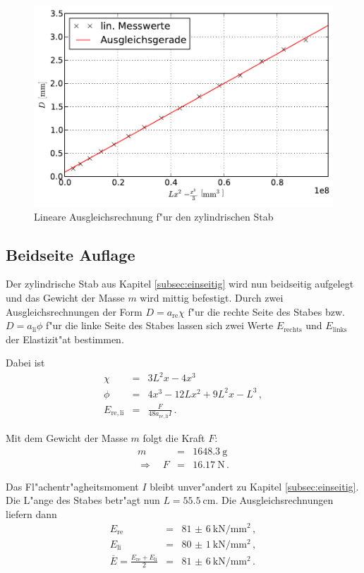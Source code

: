 		\begin{figure}[h]
			\centering
			\includegraphics[width = 13cm]{img/plot2.pdf}
			\caption{Lineare Ausgleichsrechnung f"ur den zylindrischen Stab \label{fig:plot2}}
		\end{figure}

		\clearpage

	\subsection{Beidseite Auflage}
	\label{subsec:beidseitig}
		Der zylindrische Stab aus Kapitel \ref{subsec:einseitig} wird nun beidseitig aufgelegt und das Gewicht der Masse $m$ wird mittig befestigt.
		Durch zwei Ausgleichsrechnungen der Form $D = a_\mathrm{re}\chi$ f"ur die rechte Seite des Stabes bzw. $D = a_\mathrm{li}\phi$ f"ur die linke Seite des Stabes lassen sich zwei Werte $E_\mathrm{rechts}$ und $E_\mathrm{links}$ der Elastizit"at bestimmen.

		Dabei ist
		\begin{eqnarray*}
			\chi & = & 3L^2x - 4x^3 \, \\
			\phi & = & 4x^3 - 12 Lx^2 + 9L^2x - L^3 \,, \\
			E_\mathrm{re,li} & = & \frac{F}{48 a_\mathrm{re,li} I} \,.
		\end{eqnarray*}

		Mit dem Gewicht der Masse $m$ folgt die Kraft $F$:
		\begin{eqnarray*}
			m & = & \SI{1648.3}{\gram} \, \\
			\Rightarrow \quad F & = & \SI{16.17}{\newton} \,.
		\end{eqnarray*}

		Das Fl"achentr"agheitsmoment $I$ bleibt unver"andert zu Kapitel \ref{subsec:einseitig}.
		Die L"ange des Stabes betr"agt nun $L = \SI{55.5}{\centi \meter}$.
		Die Ausgleichsrechnungen liefern dann
		\begin{eqnarray*}
			E_\mathrm{re} & = & \SI{81(6)}{\kilo \newton \per \milli \meter \squared} \,, \\
			E_\mathrm{li} & = & \SI{80(1)}{\kilo \newton \per \milli \meter \squared} \,, \\
			\overline{E} = \frac{E_\mathrm{re} + E_\mathrm{li}}{2} & = & \SI{81(6)}{\kilo \newton \per \milli \meter \squared} \,.
		\end{eqnarray*}

